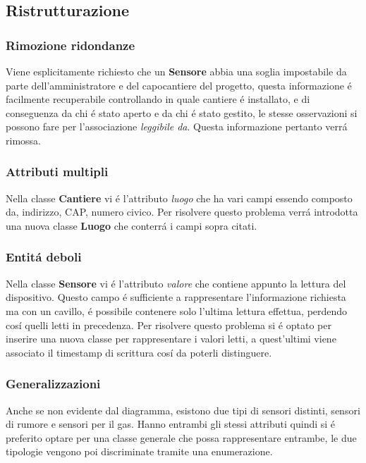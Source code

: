 \documentclass[11pt]{article}
\begin{document}
\subsection*{Ristrutturazione}
\label{sec:orgab3802d}
\subsubsection*{Rimozione ridondanze}
\label{sec:org22c2c36}
Viene esplicitamente richiesto che un \textbf{Sensore} abbia una soglia impostabile da parte dell'amministratore e del capocantiere del progetto, questa informazione é facilmente recuperabile controllando in quale cantiere é installato, e di conseguenza da chi é stato aperto e da chi é stato gestito, le stesse osservazioni si possono fare per l'associazione \emph{leggibile da}.
Questa informazione pertanto verrá rimossa.
\subsubsection*{Attributi multipli}
\label{sec:org1e4bab0}
Nella classe \textbf{Cantiere} vi é l'attributo \emph{luogo} che ha vari campi essendo composto da, indirizzo, CAP, numero civico.
Per risolvere questo problema verrá introdotta una nuova classe \textbf{Luogo} che conterrá i campi sopra citati.
\subsubsection*{Entitá deboli}
\label{sec:org2776436}
Nella classe \textbf{Sensore} vi é l'attributo \emph{valore} che contiene appunto la lettura del dispositivo.
Questo campo é sufficiente a rappresentare l'informazione richiesta ma con un cavillo, é possibile contenere solo l'ultima lettura effettua, perdendo cosí quelli letti in precedenza.
Per risolvere questo problema si é optato per inserire una nuova classe per rappresentare i valori letti, a quest'ultimi viene associato il timestamp di scrittura cosí da poterli distinguere.
\subsubsection*{Generalizzazioni}
\label{sec:org3c24d6d}
Anche se non evidente dal diagramma, esistono due tipi di sensori distinti, sensori di rumore e sensori per il gas.
Hanno entrambi gli stessi attributi quindi si é preferito optare per una classe generale che possa rappresentare entrambe, le due tipologie vengono poi discriminate tramite una enumerazione.
\end{document}
